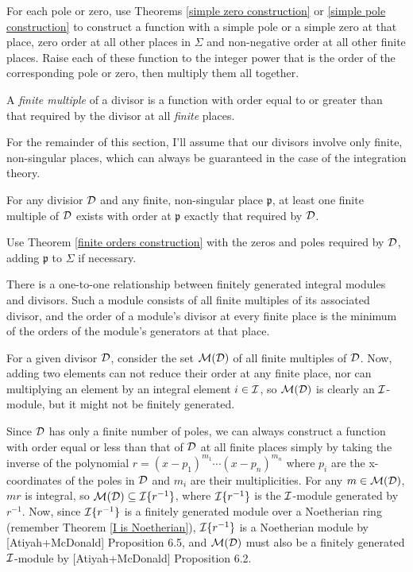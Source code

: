 For each pole or zero, use Theorems \ref{simple zero construction} or
\ref{simple pole construction} to construct a function with a simple
pole or a simple zero at that place, zero order at all other places in
$\Sigma$ and non-negative order at all other finite places.  Raise
each of these function to the integer power that is the order of the
corresponding pole or zero, then multiply them all together.

\endtheorem


A {\it finite multiple} of a divisor is a function with order equal to
or greater than that required by the divisor at all {\it finite} places.

\enddefinition

For the remainder of this section, I'll assume that our divisors
involve only finite, non-singular places, which can always be
guaranteed in the case of the integration theory.

\theorem
\label{exact order existance}

For any divisior ${\cal D}$ and any finite, non-singular place
$\mathfrak{p}$, at least one finite multiple of ${\cal D}$ exists with
order at $\mathfrak{p}$ exactly that required by ${\cal D}$.

\proof

Use Theorem \ref{finite orders construction} with the zeros and poles
required by ${\cal D}$, adding $\mathfrak{p}$
to $\Sigma$ if necessary.

\endtheorem

\theorem
\label{divisor-module isomorphism}

There is a one-to-one relationship between finitely generated integral
modules and divisors.  Such a module consists of all finite multiples
of its associated divisor, and the order of a module's divisor at
every finite place is the minimum of the orders of the module's
generators at that place.

\proof

For a given divisor ${\cal D}$, consider the set ${\cal M}({\cal D})$
of all finite multiples of ${\cal D}$.
Now, adding two
elements can not reduce their order at any finite place, nor can
multiplying an element by an integral element $i \in {\cal I}$, so
${\cal M}({\cal D})$ is clearly an ${\cal I}$-module, but it
might not be finitely generated.

Since ${\cal D}$ has only a finite number of poles, we can always
construct a function with order equal or less than that of ${\cal D}$
at all finite places simply by taking the inverse of the polynomial
$r=(x-p_1)^{m_1} \cdots (x-p_n)^{m_n}$ where $p_i$ are the x-coordinates
of the poles in ${\cal D}$ and $m_i$ are their multiplicities.
For any $m \in {\cal M}({\cal D})$, $mr$ is integral, so ${\cal M}({\cal D})
\subseteq {\cal I}\{r^{-1}\}$, where ${\cal I}\{r^{-1}\}$ is the ${\cal I}$-module
generated by $r^{-1}$.  Now, since ${\cal I}\{r^{-1}\}$ is a finitely
generated module over a Noetherian ring (remember Theorem \ref{I is
Noetherian}), ${\cal I}\{r^{-1}\}$ is a Noetherian module by
[Atiyah+McDonald] Proposition 6.5, and ${\cal M}({\cal D})$ must also
be a finitely generated ${\cal I}$-module by [Atiyah+McDonald]
Proposition 6.2.

